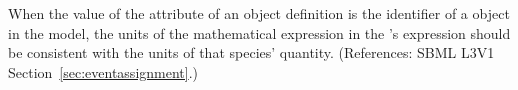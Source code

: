 When the value of the  attribute of an \EventAssignment
object definition is the identifier of a \Species object in the model, the
units of the mathematical expression in the \EventAssignment's 
expression should be consistent with the units of that species' quantity.
(References: SBML L3V1 Section~\ref{sec:eventassignment}.)
